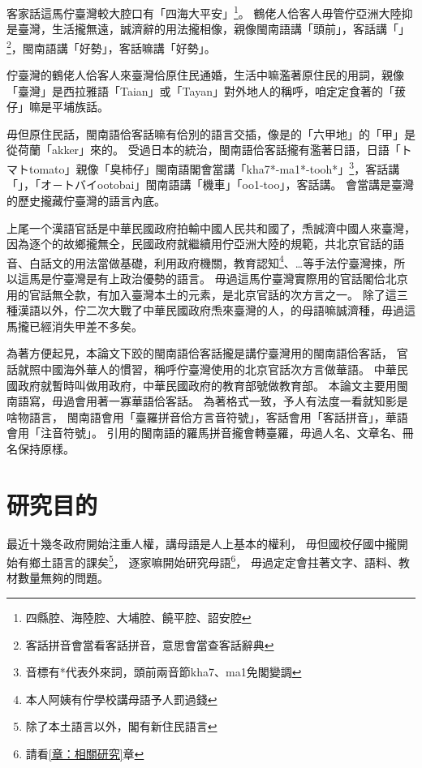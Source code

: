 客家話這馬佇臺灣較大腔口有「四海大平安」\footnote{四縣腔、海陸腔、大埔腔、饒平腔、詔安腔}。
鶴佬人佮客人毋管佇亞洲大陸抑是臺灣，生活攏無遠，誠濟辭的用法攏相像，親像閩南語講「頭前」，客話講「」\footnote{客話拼音會當看客話拼音\cite{客話拼音}，意思會當查客話辭典\cite{客話辭典}}，閩南語講「好勢」，客話嘛講「好勢」。

佇臺灣的鶴佬人佮客人來臺灣佮原住民通婚，生活中嘛濫著原住民的用詞，親像「臺灣」是西拉雅語「Taian」或「Tayan」對外地人的稱呼\cite{台灣名稱的由來}，咱定定食著的「菝仔」嘛是平埔族話\cite{客語外來語}。

毋但原住民話，閩南語佮客話嘛有佮別的語言交插，像是的「六甲地」的「甲」是從荷蘭「akker」來的\cite{台甲}。
受過日本的統治，閩南語佮客話攏有濫著日語，日語「トマトtomato」親像「臭柿仔」閩南語閣會當講「kha7*-ma1*-tooh*」\footnote{音標有*代表外來詞，頭前兩音節kha7、ma1免閣變調}，客話講「」，「オ－トバイootobai」閩南語講「機車」「oo1-too」，客話講。
會當講是臺灣的歷史攏藏佇臺灣的語言內底。

上尾一个漢語官話是中華民國政府拍輸中國人民共和國了，𤆬誠濟中國人來臺灣，因為逐个的故鄉攏無仝\cite{外省族群的母語與國語}，民國政府就繼續用佇亞洲大陸的規範，共北京官話的語音、白話文的用法當做基礎，利用政府機關，教育認知\footnote{本人阿姨有佇學校講母語予人罰過錢}、…等手法佇臺灣捒，所以這馬是佇臺灣是有上政治優勢的語言。
毋過這馬佇臺灣實際用的官話閣佮北京用的官話無仝款，有加入臺灣本土的元素，是北京官話的次方言之一。
除了這三種漢語以外，佇二次大戰了中華民國政府𤆬來臺灣的人，的母語嘛誠濟種，毋過這馬攏已經消失甲差不多矣。

為著方便起見，本論文下跤的閩南語佮客話攏是講佇臺灣用的閩南語佮客話，
官話就照中國海外華人的慣習，稱呼佇臺灣使用的北京官話次方言做華語。
中華民國政府就暫時叫做用政府，中華民國政府的教育部號做教育部。%
本論文主要用閩南語寫，毋過會用著一寡華語佮客話。
為著格式一致，予人有法度一看就知影是啥物語言，
閩南語會用「臺羅拼音\cite{}佮方言音符號\cite{}」，客話會用「客話拼音\cite{}」，華語會用「注音符號\cite{}」。
引用的閩南語的羅馬拼音攏會轉臺羅，毋過人名、文章名、冊名保持原樣。

\section{研究目的}
\label{節：研究目的}
最近十幾冬政府開始注重人權，講母語是人上基本的權利，
毋但國校仔國中攏開始有鄉土語言的課矣\footnote{除了本土語言以外，閣有新住民語言}，
逐家嘛開始研究母語\footnote{請看\ref{章：相關研究}章}，
毋過定定會拄著文字、語料、教材數量無夠的問題。


